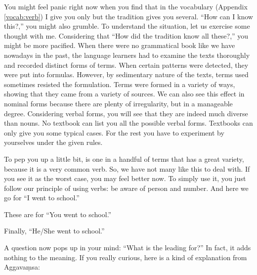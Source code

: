 You might feel panic right now when you find that in the vocabulary (Appendix \ref{vocab:verb}) I give you only  but the tradition gives you several. ``How can I know this?,'' you might also grumble. To understand the situation, let us exercise some thought with me. Considering that ``How did the tradition know all these?,'' you might be more pacified. When there were no grammatical book like we have nowadays in the past, the language learners had to examine the texts thoroughly and recorded distinct forms of terms. When certain patterns were detected, they were put into formulas. However, by sedimentary nature of the texts, terms used sometimes resisted the formulation. Terms were formed in a variety of ways, showing that they came from a variety of sources. We can also see this effect in nominal forms because there are plenty of irregularity, but in a manageable degree. Considering verbal forms, you will see that they are indeed much diverse than nouns. No textbook can list you all the possible verbal forms. Textbooks can only give you some typical cases. For the rest you have to experiment by yourselves under the given rules.

To pep you up a little bit,  is one in a handful of terms that has a great variety, because it is a very common verb. So, we have not many like this to deal with. If you see it as the worst case, you may feel better now. To simply use it, you just follow our principle of using verbs: be aware of person and number. And here we go for ``I went to school.''


These are for ``You went to school.''


Finally, ``He/She went to school.''


A question now pops up in your mind: ``What is the leading  for?'' In fact, it adds nothing to the meaning. If you really curious, here is a kind of explanation from Aggava\d msa:

